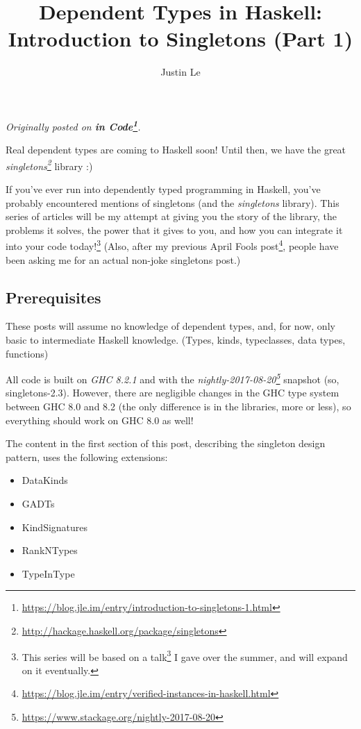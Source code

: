 \documentclass[]{article}
\title{Dependent Types in Haskell: Introduction to Singletons (Part 1)}
\author{Justin Le}
\renewcommand{\href}[2]{#2\footnote{\url{#1}}}
\begin{document}
\maketitle

\emph{Originally posted on
\textbf{\href{https://blog.jle.im/entry/introduction-to-singletons-1.html}{in
Code}}.}

Real dependent types are coming to Haskell soon! Until then, we have the great
\emph{\href{http://hackage.haskell.org/package/singletons}{singletons}} library
:)

If you've ever run into dependently typed programming in Haskell, you've
probably encountered mentions of singletons (and the \emph{singletons} library).
This series of articles will be my attempt at giving you the story of the
library, the problems it solves, the power that it gives to you, and how you can
integrate it into your code today!\footnote{This series will be based on
  \href{http://talks.jle.im/lambdaconf-2017/singletons/}{a talk} I gave over the
  summer, and will expand on it eventually.} (Also, after
\href{https://blog.jle.im/entry/verified-instances-in-haskell.html}{my previous
April Fools post}, people have been asking me for an actual non-joke singletons
post.)

\subsection{Prerequisites}\label{prerequisites}

These posts will assume no knowledge of dependent types, and, for now, only
basic to intermediate Haskell knowledge. (Types, kinds, typeclasses, data types,
functions)

All code is built on \emph{GHC 8.2.1} and with the
\emph{\href{https://www.stackage.org/nightly-2017-08-20}{nightly-2017-08-20}}
snapshot (so, singletons-2.3). However, there are negligible changes in the GHC
type system between GHC 8.0 and 8.2 (the only difference is in the libraries,
more or less), so everything should work on GHC 8.0 as well!

The content in the first section of this post, describing the singleton design
pattern, uses the following extensions:

\begin{itemize}
\tightlist
\item
  DataKinds
\item
  GADTs
\item
  KindSignatures
\item
  RankNTypes
\item
  TypeInType
\end{itemize}
\end{document}
